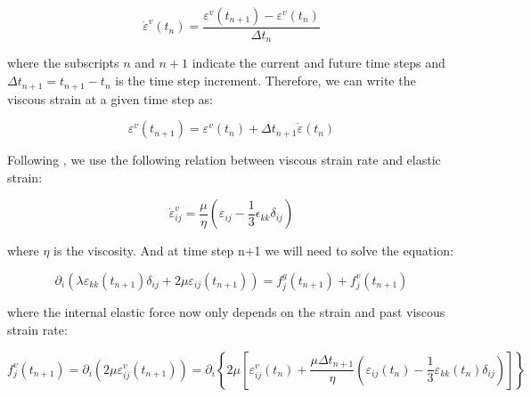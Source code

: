 \[ \dot \varepsilon^v(t_n) = \frac{\varepsilon^v(t_{n+1}) - \varepsilon^v(t_n)}{\Delta t_n} \]

where the subscripts $ n $ and $ n+1 $ indicate the current and future time steps and $ \Delta t_{n+1} = t_{n+1} - t_n $ is the time step increment. Therefore, we can write the viscous strain at a given time step as\-:

\[ \varepsilon^v(t_{n+1}) = \varepsilon^v(t_{n}) + \Delta t_{n+1} \dot \varepsilon(t_{n}) \]

Following \cite{yamasaki_houseman_12}, we use the following relation between viscous strain rate and elastic strain\-:

\[ \dot \varepsilon^v_{ij} = \frac{\mu}{\eta} \left( \varepsilon_{ij} - \frac {1}{3} \epsilon_{kk}\delta_{ij} \right) \]

where $ \eta $ is the viscosity. And at time step n+1 we will need to solve the equation\-:

\[ \partial_i \left( \lambda \varepsilon_{kk}(t_{n+1}) \delta_{ij} + 2 \mu \varepsilon_{ij}(t_{n+1}) \right) = f^g_j(t_{n+1}) + f^{v}_j(t_{n+1}) \]

where the internal elastic force now only depends on the strain and past viscous strain rate\-:

\[ f^{v}_j(t_{n+1}) = \partial_i \left( 2\mu \varepsilon^v_{ij}(t_{n+1}) \right) = \partial_i \left\{ 2\mu \left[\varepsilon^v_{ij}(t_n) + \frac{\mu \Delta t_{n+1}}{\eta} \left(\varepsilon_{ij}(t_n) - \frac{1}{3} \varepsilon_{kk}(t_n) \delta_{ij} \right) \right] \right\} \]

